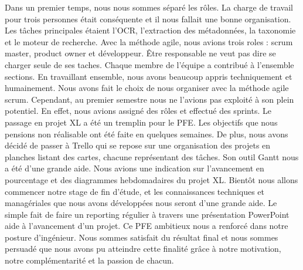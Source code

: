 Dans un premier temps, nous nous sommes séparé les rôles. La charge de travail pour trois personnes était conséquente et il nous fallait une bonne organisation. Les tâches principales étaient l’OCR, l’extraction des métadonnées, la taxonomie et le moteur de recherche. Avec la méthode agile, nous avions trois roles : scrum master, product owner et développeur.  Être responsable ne veut pas dire se charger seule de ses taches. Chaque membre de l’équipe a contribué à l’ensemble sections. En travaillant ensemble, nous avons beaucoup appris techniquement et humainement.  
Nous avons fait le choix de nous organiser avec la méthode agile scrum. Cependant, au premier semestre nous ne l’avions pas exploité à son plein potentiel. En effet, nous avions assigné des rôles et effectué des sprints. Le passage en projet XL a été un tremplin pour le PFE. Les objectifs que nous pensions non réalisable ont été faite en quelques semaines. De plus, nous avons décidé de passer à Trello qui se repose sur une organisation des projets en planches listant des cartes, chacune représentant des tâches. Son outil Gantt nous a été d’une grande aide. Nous avions une indication sur l’avancement en pourcentage et des diagrammes hebdomadaires du projet XL. 
Bientôt nous allons commencer notre stage de fin d’étude, et les connaissances techniques et managériales que nous avons développées nous seront d’une grande aide. Le simple fait de faire un reporting régulier à travers une présentation PowerPoint aide à l’avancement d’un projet. 
Ce PFE ambitieux nous a renforcé dans notre posture d’ingénieur. 
Nous sommes satisfait du résultat final et nous sommes persuadé que nous avons pu atteindre cette finalité grâce à notre motivation, notre complémentarité et la passion de chacun. 






